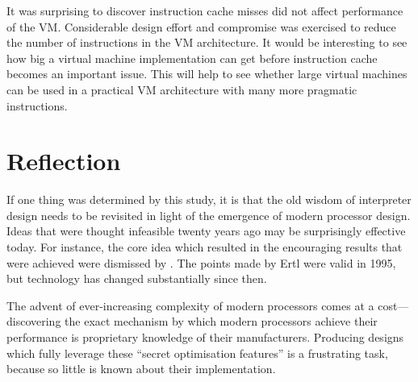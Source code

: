 	It was surprising to discover instruction cache misses did not affect performance of the VM. Considerable design effort and compromise was exercised to reduce the number of instructions in the VM architecture. It would be interesting to see how big a virtual machine implementation can get before instruction cache becomes an important issue. This will help to see whether large virtual machines can be used in a practical VM architecture with many more pragmatic instructions.
	
	\clearpage
	\section{Reflection}
	If one thing was determined by this study, it is that the old wisdom of interpreter design needs to be revisited in light of the emergence of modern processor design. Ideas that were thought infeasible twenty years ago may be surprisingly effective today. For instance, the core idea which resulted in the encouraging results that were achieved were dismissed by \cite{stackcaching}. The points made by Ertl were valid in 1995, but technology has changed substantially since then.
	
	The advent of ever-increasing complexity of modern processors comes at a cost---discovering the exact mechanism by which modern processors achieve their performance is proprietary knowledge of their manufacturers. Producing designs which fully leverage these ``secret optimisation features'' is a frustrating task, because so little is known about their implementation.
	
\bibliographysection

